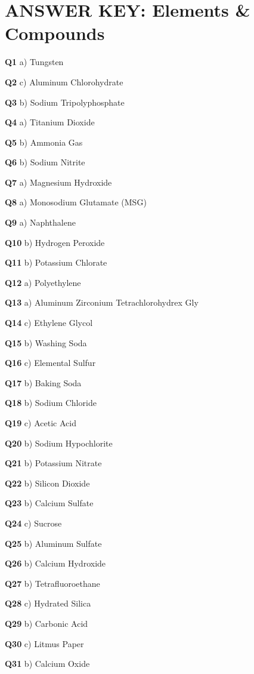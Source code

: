 \section{ANSWER KEY: Elements & Compounds}

\textbf{Q1} a) Tungsten\par
\textbf{Q2} c) Aluminum Chlorohydrate\par
\textbf{Q3} b) Sodium Tripolyphosphate\par
\textbf{Q4} a) Titanium Dioxide\par
\textbf{Q5} b) Ammonia Gas\par
\textbf{Q6} b) Sodium Nitrite\par
\textbf{Q7} a) Magnesium Hydroxide\par
\textbf{Q8} a) Monosodium Glutamate (MSG)\par
\textbf{Q9} a) Naphthalene\par
\textbf{Q10} b) Hydrogen Peroxide\par
\textbf{Q11} b) Potassium Chlorate\par
\textbf{Q12} a) Polyethylene\par
\textbf{Q13} a) Aluminum Zirconium Tetrachlorohydrex Gly\par
\textbf{Q14} c) Ethylene Glycol\par
\textbf{Q15} b) Washing Soda\par
\textbf{Q16} c) Elemental Sulfur\par
\textbf{Q17} b) Baking Soda\par
\textbf{Q18} b) Sodium Chloride\par
\textbf{Q19} c) Acetic Acid\par
\textbf{Q20} b) Sodium Hypochlorite\par
\textbf{Q21} b) Potassium Nitrate\par
\textbf{Q22} b) Silicon Dioxide\par
\textbf{Q23} b) Calcium Sulfate\par
\textbf{Q24} c) Sucrose\par
\textbf{Q25} b) Aluminum Sulfate\par
\textbf{Q26} b) Calcium Hydroxide\par
\textbf{Q27} b) Tetrafluoroethane\par
\textbf{Q28} c) Hydrated Silica\par
\textbf{Q29} b) Carbonic Acid\par
\textbf{Q30} c) Litmus Paper\par
\textbf{Q31} b) Calcium Oxide\par
